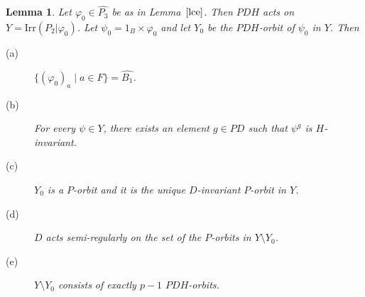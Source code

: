 \documentclass{amsart}
\newtheorem{lemma}[theorem]{Lemma}
\def\irr#1{\mathrm{Irr}(#1)}
\begin{document}
\begin{lemma}\label{lemmaY}
Let $\varphi_0\in \widehat{P_3}$ be as in Lemma~$\ref{lce}$. Then $PDH$ acts on
 $Y = \irr{P_2|\varphi_0}$.   Let $\psi_0 = 1_B \times \varphi_0$ and let $Y_0$ be the $PDH$-orbit of $\psi_0$ in $Y$.
Then
  \begin{description}
  \item[(a)] $\{(\varphi_0)_a\mid a\in F\} = \widehat{B_1}$.
    \item[(b)]For every $\psi \in Y$, there exists an element $g \in PD$ such that $\psi^g$ is $H$-invariant.
  \item[(c)]  $Y_0$ is a $P$-orbit and it is the  unique $D$-invariant $P$-orbit in $Y$.
  \item[(d)]  $D$ acts semi-regularly on the set of the $P$-orbits in $Y \setminus Y_0$.
  \item[(e)] $Y \setminus Y_0$ consists of exactly $p-1$ $PDH$-orbits.
  \end{description}
\end{lemma}
%
\end{document}
